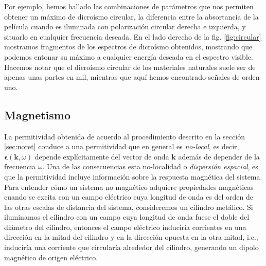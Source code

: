 \documentclass[12pt]{article}
\begin{document}
Por ejemplo, hemos hallado las combinaciones de parámetros que nos permiten obtener
un máximo de dicroísmo circular, la diferencia entre la absortancia de
la película cuando es iluminada con polarización circular derecha e
izquierda, y situarlo en cualquier frecuencia
deseada.\cite{bms16} En el lado derecho de la fig. \ref{fig:circular}
mostramos fragmentos de los espectros de dicroísmo obtenidos,
mostrando que podemos entonar su máximo a cualquier energía deseada
en el espectro visible. Hacemos notar que el dicroísmo circular de los
materiales naturales suele ser de apenas unas partes en mil, mientras
que aquí hemos encontrado señales de orden uno.
\subsection{Magnetismo}
La permitividad obtenida de acuerdo al procedimiento descrito en la
sección \ref{sec:noret} conduce a una permitividad que en general es
{\em no-local}, es decir, $\bm\epsilon(\bm k,\omega)$ depende
explícitamente del
vector de onda $\bm k$ además de depender de la frecuencia
$\omega$. Una de las consecuencias esta no-localidad o {\em dispersión
  espacial}, es que la
permitividad incluye información sobre la respuesta magnética del
sistema. Para entender cómo un sistema no magnético adquiere
propiedades magnéticas cuando se excita con un campo eléctrico cuya
longitud de onda es del orden de las otras escalas de distancia del
sistema, consideremos un cilindro metálico. Si iluminamos el cilindro
con un campo cuya longitud de onda fuese el doble del diámetro del
cilindro, entonces el campo eléctrico induciría corrientes en una
dirección en la mitad del cilindro y en la dirección opuesta en la
otra mitad, i.e., induciría una corriente que circularía alrededor del
cilindro, generando un dipolo magnético de origen eléctrico.
\end{document}
